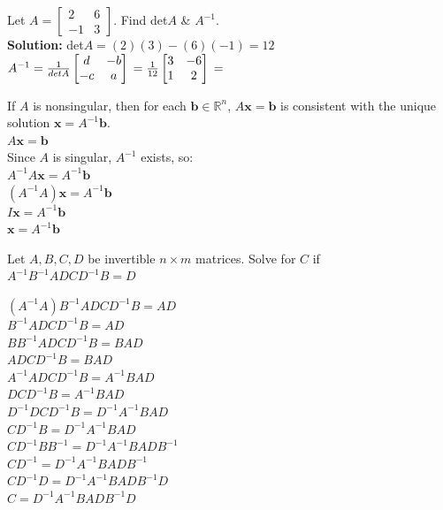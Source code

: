 \documentclass{report}
\begin{document}
\begin{example}
Let $A = \begin{bmatrix} 2 & 6 \\ -1 & 3 \end{bmatrix}$. Find det$A$ \& $A^{-1}$.\\
\smallskip\textbf{Solution:}
det$A = (2)(3) - (6)(-1) = 12$\\
$A^{-1} = \frac{1}{det A}\begin{bmatrix} d & -b \\ -c & a \end{bmatrix}\\
= \frac{1}{12} \begin{bmatrix} 3 & -6 \\ 1 & 2 \end{bmatrix}\\
= $
\end{example}

\begin{theorem}
If $A$ is nonsingular, then for each $\mathbf{b}\in\mathbb{R}^n$, $A\mathbf{x}=\mathbf{b}$ is consistent with the unique solution $\mathbf{x}=A^{-1}\mathbf{b}$.\\
$A\mathbf{x}=\mathbf{b}$\\
Since $A$ is singular, $A^{-1}$ exists, so:\\
$A^{-1}A\mathbf{x}=A^{-1}\mathbf{b}$\\
$(A^{-1}A)\mathbf{x}=A^{-1}\mathbf{b}$\\
$I\mathbf{x}=A^{-1}\mathbf{b}$\\
$\mathbf{x}=A^{-1}\mathbf{b}$\\
\end{theorem}

\begin{example}
Let $A, B, C, D$ be invertible $n\times m$ matrices. Solve for $C$ if \\$A^{-1}B^{-1}ADCD^{-1}B=D$
\begin{center}
	$(A^{-1}A)B^{-1}ADCD^{-1}B=AD$\\
	$B^{-1}ADCD^{-1}B=AD$\\
	$BB^{-1}ADCD^{-1}B=BAD$\\
	$ADCD^{-1}B=BAD$\\
	$A^{-1}ADCD^{-1}B=A^{-1}BAD$\\
	$DCD^{-1}B=A^{-1}BAD$\\
	$D^{-1}DCD^{-1}B=D^{-1}A^{-1}BAD$\\
	$CD^{-1}B=D^{-1}A^{-1}BAD$\\
	$CD^{-1}BB^{-1}=D^{-1}A^{-1}BADB^{-1}$\\
	$CD^{-1}=D^{-1}A^{-1}BADB^{-1}$\\
	$CD^{-1}D=D^{-1}A^{-1}BADB^{-1}D$\\
	$C=D^{-1}A^{-1}BADB^{-1}D$\\	
\end{center}
\end{example}
\end{document}
